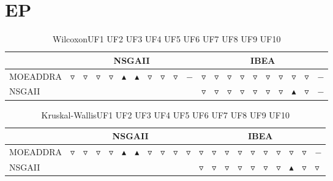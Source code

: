 \documentclass{article}
\begin{document}
\newpage
\section{EP}

\begin{table}[!h]
\caption{WilcoxonUF1 UF2 UF3 UF4 UF5 UF6 UF7 UF8 UF9 UF10 }
\label{Table:wilcoxon}
\centering
\begin{scriptsize}
\begin{tabular}{| l | p{0.03cm }p{0.03cm }p{0.03cm }p{0.03cm }p{0.03cm }p{0.03cm }p{0.03cm }p{0.03cm }p{0.03cm }p{0.03cm } | p{0.03cm }p{0.03cm }p{0.03cm }p{0.03cm }p{0.03cm }p{0.03cm }p{0.03cm }p{0.03cm }p{0.03cm }p{0.03cm } | }
\hline \multicolumn{1}{|c|}{} & \multicolumn{10}{c|}{NSGAII}& \multicolumn{10}{c|}{IBEA}\\
\hline 
MOEADDRA  & $\triangledown$&$\triangledown$&$\triangledown$&$\triangledown$&$\blacktriangle$&$\blacktriangle$&$\triangledown$&$\triangledown$&$\triangledown$&$-$ & $\triangledown$&$\triangledown$&$\triangledown$&$\triangledown$&$\triangledown$&$\triangledown$&$\triangledown$&$\triangledown$&$\triangledown$&$-$ \\ 
NSGAII  &   &  &  &  &  &  &  &  &  &   & $\triangledown$&$\triangledown$&$\triangledown$&$\triangledown$&$\triangledown$&$\triangledown$&$\triangledown$&$\blacktriangle$&$\triangledown$&$-$ \\ 
\hline
\end{tabular}
\end{scriptsize}
\end{table}


\begin{table}[!h]
\caption{Kruskal-WallisUF1 UF2 UF3 UF4 UF5 UF6 UF7 UF8 UF9 UF10 }
\label{Table:kruskal}
\centering
\begin{scriptsize}
\begin{tabular}{| l | p{0.03cm }p{0.03cm }p{0.03cm }p{0.03cm }p{0.03cm }p{0.03cm }p{0.03cm }p{0.03cm }p{0.03cm }p{0.03cm } | p{0.03cm }p{0.03cm }p{0.03cm }p{0.03cm }p{0.03cm }p{0.03cm }p{0.03cm }p{0.03cm }p{0.03cm }p{0.03cm } | }
\hline \multicolumn{1}{|c|}{} & \multicolumn{10}{c|}{NSGAII}& \multicolumn{10}{c|}{IBEA}\\
\hline 
MOEADDRA  & $\triangledown$&$\triangledown$&$\triangledown$&$\triangledown$&$\blacktriangle$&$\blacktriangle$&$\triangledown$&$\triangledown$&$\triangledown$&$\triangledown$ & $\triangledown$&$\triangledown$&$\triangledown$&$\triangledown$&$\triangledown$&$\triangledown$&$\triangledown$&$\triangledown$&$\triangledown$&$-$ \\ 
NSGAII  &   &  &  &  &  &  &  &  &  &   & $\triangledown$&$\triangledown$&$\triangledown$&$\triangledown$&$\triangledown$&$\triangledown$&$\triangledown$&$\blacktriangle$&$\triangledown$&$\triangledown$ \\ 
\hline
\end{tabular}
\end{scriptsize}
\end{table}
\end{document}
